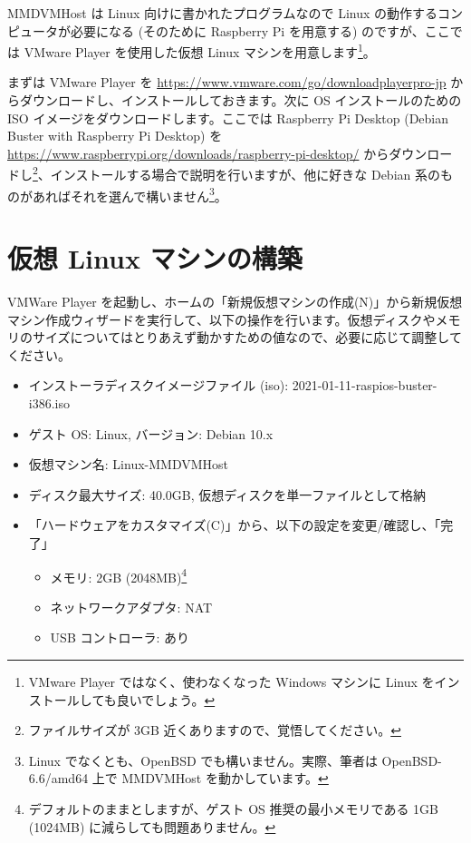 \documentclass[a4j,oneside]{ujbook}
\begin{document}
MMDVMHost は Linux 向けに書かれたプログラムなので Linux の動作するコンピュータが必要になる (そのために Raspberry Pi を用意する) のですが、ここでは VMware Player を使用した仮想 Linux マシンを用意します\footnote{VMware Player ではなく、使わなくなった Windows マシンに Linux をインストールしても良いでしょう。}。

まずは VMware Player を \url{https://www.vmware.com/go/downloadplayerpro-jp} からダウンロードし、インストールしておきます。次に OS インストールのための ISO イメージをダウンロードします。ここでは Raspberry Pi Desktop (Debian Buster with Raspberry Pi Desktop) を \url{https://www.raspberrypi.org/downloads/raspberry-pi-desktop/} からダウンロードし\footnote{ファイルサイズが 3GB 近くありますので、覚悟してください。}、インストールする場合で説明を行いますが、他に好きな Debian 系のものがあればそれを選んで構いません\footnote{Linux でなくとも、OpenBSD でも構いません。実際、筆者は OpenBSD-6.6/amd64 上で MMDVMHost を動かしています。}。

\section{仮想 Linux マシンの構築}

VMWare Player を起動し、ホームの「新規仮想マシンの作成(N)」から新規仮想マシン作成ウィザードを実行して、以下の操作を行います。仮想ディスクやメモリのサイズについてはとりあえず動かすための値なので、必要に応じて調整してください。

\begin{itemize}
 \item インストーラディスクイメージファイル (iso): 2021-01-11-raspios-buster-i386.iso
 \item ゲスト OS: Linux, バージョン: Debian 10.x
 \item 仮想マシン名: Linux-MMDVMHost
 \item ディスク最大サイズ: 40.0GB, 仮想ディスクを単一ファイルとして格納
 \item 「ハードウェアをカスタマイズ(C)」から、以下の設定を変更/確認し、「完了」
 \begin{itemize}
  \item メモリ: 2GB (2048MB)\footnote{デフォルトのままとしますが、ゲスト OS 推奨の最小メモリである 1GB (1024MB) に減らしても問題ありません。}
  \item ネットワークアダプタ: NAT
  \item USB コントローラ: あり
 \end{itemize}
\end{itemize}
\end{document}

